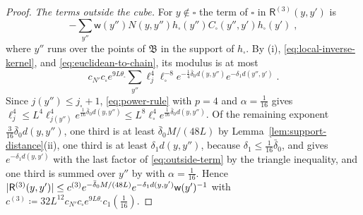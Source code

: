 \documentclass[11pt]{preprint}
\DeclarePairedDelimiter{\abs}{\lvert}{\rvert}
\numberwithin{equation}{section}
\theoremstyle{definition}
\theoremstyle{remark}
\theoremstyle{plain}
\begin{document}
\begin{proof}
\emph{The terms outside the cube.} For $y \notin \square$ the term of $\square$ in $\mathsf R^{(3)}(y, y')$ is
\begin{equation}\label{eq:outside-kernel}
    -\sum_{y''}\mathsf w(y'')N(y, y'')h_\square(y'')C_\square(y'', y')h_\square(y')\;,
\end{equation}
where $y''$ runs over the points of $\mathfrak B$ in the support of $h_\square$. By (i), \eqref{eq:local-inverse-kernel}, and \eqref{eq:euclidean-to-chain}, its modulus is at most
\begin{equation}\label{eq:outside-term}
    c_{N'}c_\square e^{9L\theta_\square}\sum_{y''}\ell_j^4\ell_\square^{-8}e^{-\frac14\bar\delta_0d(y, y'')}e^{-\delta_1d(y'', y')}\;.
\end{equation}
Since $j(y'') \leq j_\square + 1$, \eqref{eq:power-rule} with $p = 4$ and $\alpha = \frac{1}{16}$ gives $\ell_j^4 \leq L^4\ell_{j(y'')}^4e^{\frac{1}{16}\bar\delta_0d(y, y'')} \leq L^8\ell_\square^4e^{\frac{1}{16}\bar\delta_0d(y, y'')}$. Of the remaining exponent $\frac{3}{16}\bar\delta_0d(y, y'')$, one third is at least $\bar\delta_0M/(48L)$ by Lemma~\ref{lem:support-distance}(ii), one third is at least $\delta_1d(y, y'')$, because $\delta_1 \leq \frac{1}{16}\bar\delta_0$, and gives $e^{-\delta_1d(y, y')}$ with the last factor of \eqref{eq:outside-term} by the triangle inequality, and one third is summed over $y''$ by \cite[(2.61)]{BalabanPRT2} with $\alpha = \frac{1}{16}$. Hence $\abs{\mathsf R^{(3)}(y, y')} \leq c^{(3)}e^{-\bar\delta_0M/(48L)}e^{-\delta_1d(y, y')}\mathsf w(y')^{-1}$ with $c^{(3)} \coloneqq 32L^{12}c_{N'}c_\square e^{9L\theta_\square}c_1(\frac{1}{16})$.


\end{proof}
\end{document}
